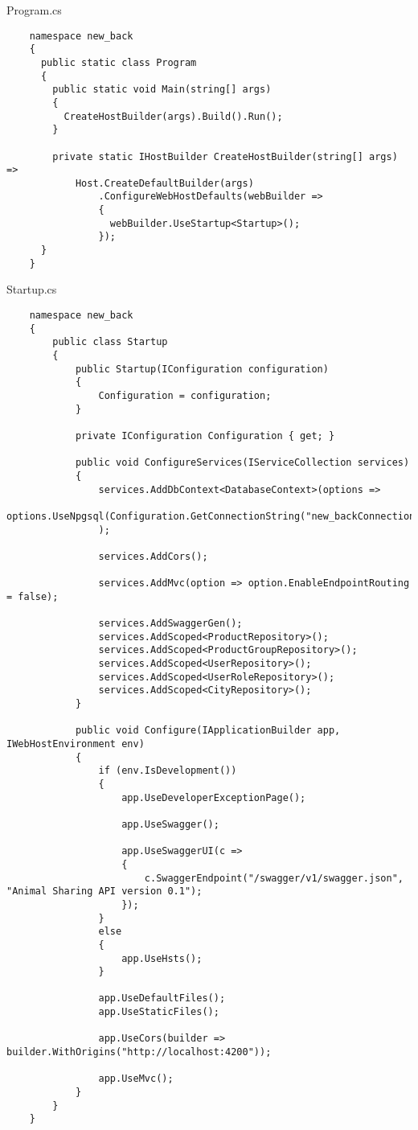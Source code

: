 
Program.cs
\lstset{style=sharpc}
\begin{lstlisting}
    namespace new_back
    {
      public static class Program
      {
        public static void Main(string[] args)
        {
          CreateHostBuilder(args).Build().Run();
        }
    
        private static IHostBuilder CreateHostBuilder(string[] args) =>
            Host.CreateDefaultBuilder(args)
                .ConfigureWebHostDefaults(webBuilder =>
                {
                  webBuilder.UseStartup<Startup>();
                });
      }
    }
\end{lstlisting}

Startup.cs
\lstset{style=sharpc}
\begin{lstlisting}
    namespace new_back
    {
        public class Startup
        {
            public Startup(IConfiguration configuration)
            {
                Configuration = configuration;
            }
    
            private IConfiguration Configuration { get; }
    
            public void ConfigureServices(IServiceCollection services)
            {
                services.AddDbContext<DatabaseContext>(options =>
                    options.UseNpgsql(Configuration.GetConnectionString("new_backConnection"))
                );
    
                services.AddCors();
    
                services.AddMvc(option => option.EnableEndpointRouting = false);
    
                services.AddSwaggerGen();
                services.AddScoped<ProductRepository>();
                services.AddScoped<ProductGroupRepository>();
                services.AddScoped<UserRepository>();
                services.AddScoped<UserRoleRepository>();
                services.AddScoped<CityRepository>();
            }
    
            public void Configure(IApplicationBuilder app, IWebHostEnvironment env)
            {
                if (env.IsDevelopment())
                {
                    app.UseDeveloperExceptionPage();
    
                    app.UseSwagger();
    
                    app.UseSwaggerUI(c =>
                    {
                        c.SwaggerEndpoint("/swagger/v1/swagger.json", "Animal Sharing API version 0.1");
                    });
                }
                else
                {
                    app.UseHsts();
                }
    
                app.UseDefaultFiles();
                app.UseStaticFiles();
    
                app.UseCors(builder => builder.WithOrigins("http://localhost:4200"));
    
                app.UseMvc();
            }
        }
    }
\end{lstlisting}

